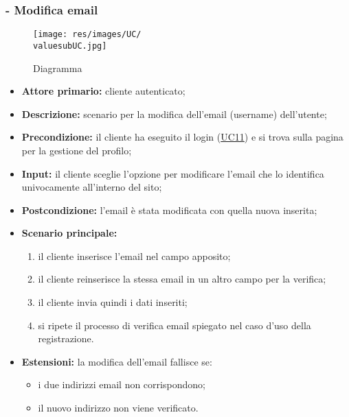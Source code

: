 \subsubsection{ - Modifica email}
\begin{figure}[H]
    \centering
    \texttt{[image: res/images/UC/\\valuesubUC.jpg]}
    \caption{Diagramma }
\end{figure}
\begin{itemize}
    \item \textbf{Attore primario:} cliente autenticato;
    \item \textbf{Descrizione:} scenario per la modifica dell'email (username) dell'utente;
    \item \textbf{Precondizione:} il cliente ha eseguito il login (\hyperref[UC11]{UC11}) e si trova sulla pagina per la gestione del profilo;
    \item \textbf{Input:} il cliente sceglie l'opzione per modificare l'email che lo identifica univocamente all'interno del sito;
    \item \textbf{Postcondizione:} l'email è stata modificata con quella nuova inserita;
    \item \textbf{Scenario principale:}
          \begin{enumerate}
              \item il cliente inserisce l'email nel campo apposito;
              \item il cliente reinserisce la stessa email in un altro campo per la verifica;
              \item il cliente invia quindi i dati inseriti;
              \item si ripete il processo di verifica email spiegato nel caso d'uso della registrazione.
          \end{enumerate}
    \item \textbf{Estensioni:} la modifica dell'email fallisce se:
          \begin{itemize}
              \item i due indirizzi email non corrispondono;
              \item il nuovo indirizzo non viene verificato.
          \end{itemize}
\end{itemize}

\stepsubUserCase
